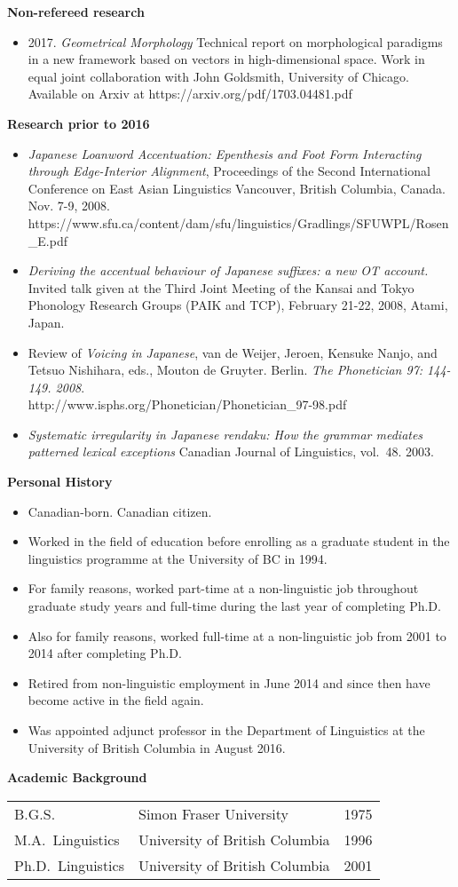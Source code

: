 \documentclass[11pt]{article}
\newcommand{\bo}[1]{\textbf{#1}}
\newcommand{\bi}{\begin{itemize}}
\newcommand{\ii}{\item}
\newcommand{\ei}{\end{itemize}}
\begin{document}
\noindent\bo{Non-refereed research}

\bi
\ii[] 2017. \textit{Geometrical Morphology} Technical report on morphological paradigms in a new framework based on vectors in high-dimensional space. Work in equal joint collaboration with John Goldsmith, University of Chicago. Available on Arxiv at https://arxiv.org/pdf/1703.04481.pdf 
\ei

\noindent \bo{Research prior to 2016}
\bi
\ii[] \textit{Japanese Loanword Accentuation: Epenthesis and Foot Form Interacting through Edge-Interior Alignment}, Proceedings of the Second International Conference on East Asian Linguistics Vancouver, British Columbia, Canada. Nov. 7-9, 2008.\\ 
https://www.sfu.ca/content/dam/sfu/linguistics/Gradlings/SFUWPL/Rosen\_E.pdf

\ii[] \textit{Deriving the accentual behaviour of Japanese suffixes: a new OT account.} Invited talk given at the Third Joint Meeting of the Kansai and Tokyo Phonology Research Groups (PAIK and TCP), February 21-22, 2008, Atami, Japan. 
\ii[] Review of \textit{Voicing in Japanese}, van de Weijer, Jeroen, Kensuke Nanjo, and Tetsuo Nishihara, eds., Mouton de Gruyter. Berlin. \textit{The Phonetician 97: 144-149. 2008}.\\
 http://www.isphs.org/Phonetician/Phonetician\_97-98.pdf
\ii[] \textit{Systematic irregularity in Japanese rendaku: How the grammar mediates patterned lexical exceptions}
Canadian Journal of Linguistics, vol.\ 48. 2003.
\ei

\noindent \textbf{Personal History}
\begin{itemize}
\ii[] Canadian-born. Canadian citizen. 
\ii[] Worked in the field of education before enrolling as a graduate student in the linguistics programme at the University of BC in 1994. 
\ii[] For family reasons, worked part-time at a non-linguistic job throughout graduate study years and full-time during the last year of completing Ph.D.
\ii[] Also for family reasons, worked full-time at a non-linguistic job from 2001 to 2014 after completing Ph.D.
\ii[] Retired from non-linguistic employment in June 2014 and since then have become active in the field again.
\ii[] Was appointed adjunct professor in the Department of Linguistics at the University of British Columbia in August 2016.
\end{itemize}

\noindent \textbf{Academic Background}

\medskip

\begin{tabular}{lll}


B.G.S.\  & Simon Fraser University  &     1975 \\

M.A.\,  Linguistics  &   University of British Columbia  &   1996 \\

Ph.D.\, Linguistics &  University of British Columbia &    2001\\
\end{tabular}
\end{document}
